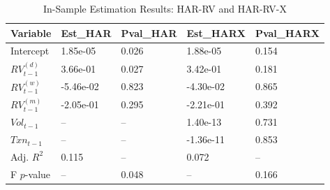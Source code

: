 \begin{table}[ht]
\centering
\begin{tabular}{lllll}
  \hline
Variable & Est_HAR & Pval_HAR & Est_HARX & Pval_HARX \\ 
  \hline
Intercept & 1.85e-05 & 0.026 & 1.88e-05 & 0.154 \\ 
  $RV_{t-1}^{(d)}$ & 3.66e-01 & 0.027 & 3.42e-01 & 0.181 \\ 
  $RV_{t-1}^{(w)}$ & -5.46e-02 & 0.823 & -4.30e-02 & 0.865 \\ 
  $RV_{t-1}^{(m)}$ & -2.05e-01 & 0.295 & -2.21e-01 & 0.392 \\ 
  $Vol_{t-1}$ & -- & -- & 1.40e-13 & 0.731 \\ 
  $Txn_{t-1}$ & -- & -- & -1.36e-11 & 0.853 \\ 
  Adj. $R^2$ & 0.115 & -- & 0.072 & -- \\ 
  F $p$-value & -- & 0.048 & -- & 0.166 \\ 
   \hline
\end{tabular}
\caption{In-Sample Estimation Results: HAR-RV and HAR-RV-X} 
\label{tab:insample}
\end{table}
